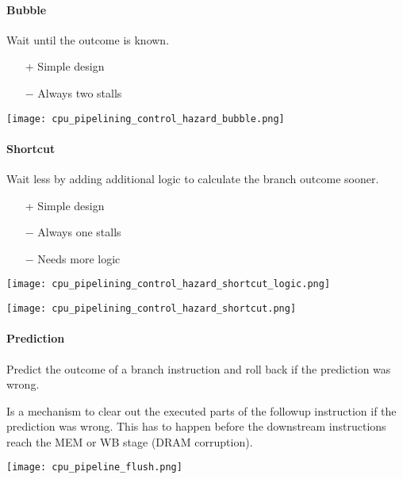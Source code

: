 \begin{multicols*}{2}
    \paragraph{Bubble}\label{bubble}

    Wait until the outcome is known.
    \begin{itemize}
        \item[+] Simple design
        \item[$-$] Always two stalls
    \end{itemize}

    \texttt{[image: cpu\_pipelining\_control\_hazard\_bubble.png]}

    \paragraph{Shortcut}\label{shortcut}

    Wait less by adding additional logic to calculate the branch outcome sooner.

    \begin{itemize}
        \item[+] Simple design
        \item[$-$] Always one stalls
        \item[$-$] Needs more logic
    \end{itemize}

    \texttt{[image: cpu\_pipelining\_control\_hazard\_shortcut\_logic.png]}

    \texttt{[image: cpu\_pipelining\_control\_hazard\_shortcut.png]}

    \paragraph{Prediction}\label{prediction}

    Predict the outcome of a branch instruction and roll back if the prediction was wrong.

    \newpar{}

    Is a mechanism to clear out the executed parts of the followup instruction if the prediction was wrong. This has to happen before the downstream instructions reach the MEM or WB stage (DRAM corruption).
    \begin{center}
        \texttt{[image: cpu\_pipeline\_flush.png]}
    \end{center}
    \newpar{}


\end{multicols*}
